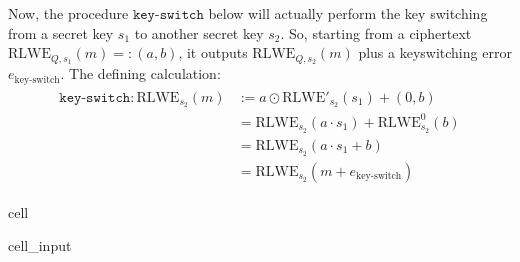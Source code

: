\documentclass[letterpaper,10pt,english]{jupyterBook}
\begin{document}
\sphinxAtStartPar
Now, the procedure \(\texttt{key-switch}\) below will actually perform the key switching from a secret key \(s_1\) to another secret key \(s_2\).
So, starting from a ciphertext \(\mathrm{RLWE}_{Q,s_1}(m) =: (a,b)\), it outputs \(\mathrm{RLWE}_{Q,s_2}(m)\) plus a key\sphinxhyphen{}switching error \(e_{\text{key-switch}}\).
The defining calculation:
\begin{equation*}
\begin{split}\begin{split}
\texttt{key-switch}: \mathrm{RLWE}_{s_2}(m) &:= a \odot \mathrm{RLWE'}_{s_2}(s_1) + (0,b) \\
&= \mathrm{RLWE}_{s_2}(a\cdot s_1) + \mathrm{RLWE}_{s_2}^0(b) \\
&= \mathrm{RLWE}_{s_2}(a\cdot s_1 + b) 
\\ &= \mathrm{RLWE}_{s_2}(m+e_{\text{key-switch}})
\end{split}\end{split}
\end{equation*}
\begin{sphinxuseclass}{cell}\begin{sphinxVerbatimInput}

\begin{sphinxuseclass}{cell_input}
\begin{sphinxVerbatim}[commandchars=\\\{\}]
    
         \PYG{p}{[}\PYG{p}{]} \PYG{p}{[}\PYG{p}{]}  
       
         \PYG{p}{[} \PYG{p}{]} 
\end{sphinxVerbatim}

\end{sphinxuseclass}\end{sphinxVerbatimInput}

\end{sphinxuseclass}
\end{document}
